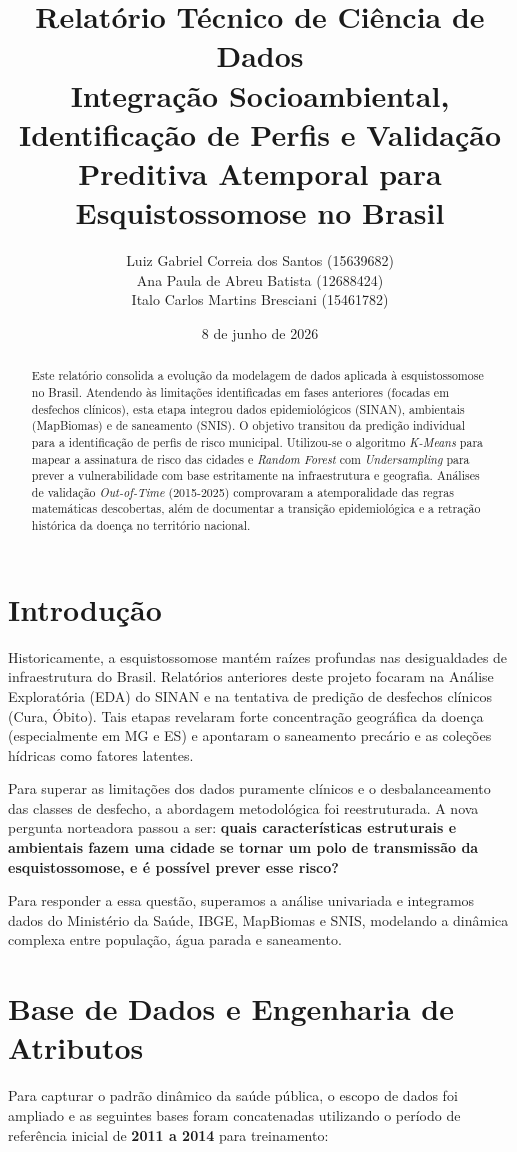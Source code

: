\documentclass[12pt,a4paper]{article}
\title{\textbf{Relatório Técnico de Ciência de Dados}\\ \large Integração Socioambiental, Identificação de Perfis e Validação Preditiva Atemporal para Esquistossomose no Brasil}
\author{
    Luiz Gabriel Correia dos Santos (15639682) \\
    Ana Paula de Abreu Batista (12688424) \\
    Italo Carlos Martins Bresciani (15461782)
}
\date{8 de junho de 2026}
\begin{document}
\maketitle

\begin{abstract}
Este relatório consolida a evolução da modelagem de dados aplicada à esquistossomose no Brasil. Atendendo às limitações identificadas em fases anteriores (focadas em desfechos clínicos), esta etapa integrou dados epidemiológicos (SINAN), ambientais (MapBiomas) e de saneamento (SNIS). O objetivo transitou da predição individual para a identificação de perfis de risco municipal. Utilizou-se o algoritmo \textit{K-Means} para mapear a assinatura de risco das cidades e \textit{Random Forest} com \textit{Undersampling} para prever a vulnerabilidade com base estritamente na infraestrutura e geografia. Análises de validação \textit{Out-of-Time} (2015-2025) comprovaram a atemporalidade das regras matemáticas descobertas, além de documentar a transição epidemiológica e a retração histórica da doença no território nacional.
\end{abstract}

\section{Introdução}
Historicamente, a esquistossomose mantém raízes profundas nas desigualdades de infraestrutura do Brasil. Relatórios anteriores deste projeto focaram na Análise Exploratória (EDA) do SINAN e na tentativa de predição de desfechos clínicos (Cura, Óbito). Tais etapas revelaram forte concentração geográfica da doença (especialmente em MG e ES) e apontaram o saneamento precário e as coleções hídricas como fatores latentes. 

Para superar as limitações dos dados puramente clínicos e o desbalanceamento das classes de desfecho, a abordagem metodológica foi reestruturada. A nova pergunta norteadora passou a ser: \textbf{quais características estruturais e ambientais fazem uma cidade se tornar um polo de transmissão da esquistossomose, e é possível prever esse risco?}

Para responder a essa questão, superamos a análise univariada e integramos dados do Ministério da Saúde, IBGE, MapBiomas e SNIS, modelando a dinâmica complexa entre população, água parada e saneamento.

\section{Base de Dados e Engenharia de Atributos}
Para capturar o padrão dinâmico da saúde pública, o escopo de dados foi ampliado e as seguintes bases foram concatenadas utilizando o período de referência inicial de \textbf{2011 a 2014} para treinamento:
\end{document}
